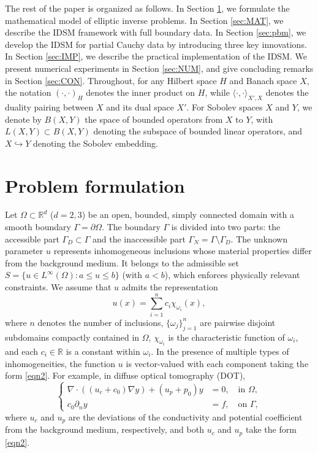 \documentclass[onefignum,onetabnum]{siamart190516}
\numberwithin{equation}{section}
\begin{document}
The rest of the paper is organized as follows.
In Section \ref{sec:PRO}, we formulate the mathematical model of elliptic inverse problems.
In Section \ref{sec:MAT}, we describe the IDSM framework with full boundary data.
In Section \ref{sec:pbm}, we develop the IDSM for partial Cauchy data by introducing three key innovations.
In Section \ref{sec:IMP}, we describe the practical implementation of the IDSM.
We present numerical experiments in Section \ref{sec:NUM}, and give concluding remarks in Section \ref{sec:CON}.
Throughout, for any Hilbert space $H$ and Banach space $X$, the notation $(\cdot, \cdot)_H$ denotes the inner product on $H$, while $\langle \cdot, \cdot \rangle_{X', X}$ denotes the duality pairing between $X$ and its dual space $X'$.
For Sobolev spaces $X$ and $Y$, we denote by $B(X,Y)$ the space of bounded operators from $X$ to $Y$, with $L(X,Y) \subset B(X,Y)$ denoting the subspace of bounded linear operators, and $X \hookrightarrow Y$ denoting the Sobolev embedding.

\section{Problem formulation}\label{sec:PRO}
Let $\Omega\subset \mathbb{R}^{d}$ ($d=2,3$) be an open, bounded, simply connected domain with a smooth boundary $\Gamma=\partial\Omega$.
The boundary $\Gamma$ is divided into two parts: the accessible part $\Gamma_{D}\subset \Gamma$ and the inaccessible part $\Gamma_{N}=\Gamma\setminus\Gamma_{D}$.
The unknown parameter $u$ represents inhomogeneous inclusions whose material properties differ from the background medium. It belongs to the admissible set $S = \{u{\in L^{\infty}(\Omega)} : a \leq u \leq b\}$ (with $a < b$), which enforces physically relevant constraints.
We assume that $u$ admits the representation
\begin{equation}\label{eqn2}
u(x) = \sum_{i=1}^n c_i \chi_{\omega_i}(x),
\end{equation}
where $n$ denotes the number of inclusions, $\{\omega_j\}_{j=1}^n$ are pairwise disjoint subdomains compactly contained in $\Omega$, $\chi_{\omega_i}$ is the characteristic function of $\omega_i$, and each $c_i \in \mathbb{R}$ is a constant within $\omega_i$.
In the presence of multiple types of inhomogeneities, the function $u$ is vector-valued with each component taking the form \eqref{eqn2}.
For example, in diffuse optical tomography (DOT),
\begin{equation}\label{eqn3}
\left\{\begin{aligned}
\nabla \cdot ((u_{c}+c_{0}) \nabla y) + (u_{p}+p_{0}) y &= 0, \quad \text{in } \Omega, \\
c_{0} \partial_{n}y &= f, \quad \text{on } \Gamma,
\end{aligned}\right.
\end{equation}
where $u_c$ and $u_{p}$ are the deviations of the conductivity and potential coefficient from the background medium, respectively{,   and both $u_c$ and $u_p$ take the form \eqref{eqn2}.}
\end{document}
